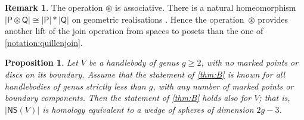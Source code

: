 \documentclass[11pt]{article}
\theoremstyle{plain}
\newtheorem{prop}[thm]{Proposition}
\theoremstyle{definition}
\newtheorem{rem}[thm]{Remark}
\let\altjoin\circledast
\newcommand{\NS}{\mathsf{NS}}
\begin{document}
\begin{rem}
The operation $\altjoin$ is associative. There is a natural homeomorphism $|\mathsf P \altjoin \mathsf Q| \cong |\mathsf P| \ast |\mathsf Q|$ on geometric realisations \cite[Prop.\,1.9]{quillen-homotopyproperties}. Hence the operation~$\altjoin$ provides another lift of the join operation from spaces to posets than the one of \cref{notation:quillenjoin}.
\end{rem}

\begin{prop}\label{final prop}Let $V$ be a handlebody of genus $g \geq 2$, with no marked points or discs on its boundary. Assume that the statement of \cref{thm:B} is known for all handlebodies of genus strictly less than $g$, with any number of marked points or boundary components. Then the statement of \cref{thm:B} holds also for $V$; that is, $|\NS(V)|$ is homology equivalent to a wedge of spheres of dimension $2g-3$.
\end{prop}
\end{document}
